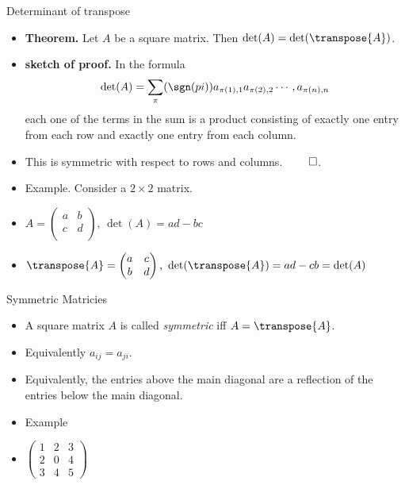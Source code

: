 \documentclass{beamer}
\begin{document}

\begin{frame}{Determinant of transpose}
\begin{itemize}
\item \textbf{Theorem.} Let $A$ be a square matrix. Then $\det(A) = \det(\transpose{A})$.
\item \textbf{sketch of proof.}  In the formula
$$
\det(A) = \sum_{\pi} (\sgn(pi)) a_{\pi(1),1} a_{\pi(2), 2} \cdots, a_{\pi(n), n}
$$
each one of the terms in the sum is a product consisting of exactly one entry from each row and exactly one entry from each column.
\item This is symmetric with respect to rows and columns. $\qed$.
\item Example. Consider a $2\times 2$ matrix.
\item
$
A =
\begin{pmatrix}
a & b \\
c & d \\
\end{pmatrix}
\text{, }
\det(A) = ad - bc
$
\item
$
\transpose{A} =
\begin{pmatrix}
a & c \\
b & d \\
\end{pmatrix}
\text{, }
\det(\transpose{A}) = ad - cb = \det(A)
$
\end{itemize}
\end{frame}




\begin{frame}{Symmetric Matricies}
\begin{itemize}
\item A square matrix $A$ is called \emph{symmetric} iff $A=\transpose{A}$.
\item Equivalently $a_{ij} = a_{ji}$.
\item Equivalently, the entries above the main diagonal are a reflection of the entries below the main diagonal.
\item Example
\item $
\begin{pmatrix}
1 & 2 & 3 \\
2 & 0 & 4 \\
3 & 4 & 5
\end{pmatrix}
$
\end{itemize}
\end{frame}
\end{document}
